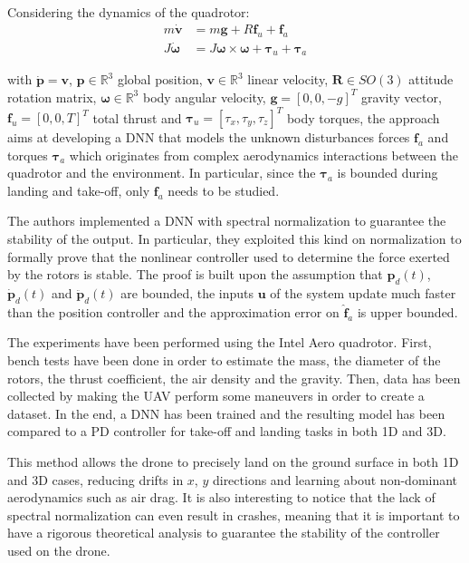 \documentclass[a4paper]{article}
\begin{document}
Considering the dynamics of the quadrotor:
\begin{align}
    m\bm{\dot{v}} &= m\bm{g} + R\bm{f}_u + \bm{f}_a \\
    J\bm{\dot{\omega}} &= J\bm{\omega} \times \bm{\omega} + \bm{\tau}_u + \bm{\tau}_a
\end{align}

\noindent with $\bm{\dot{p}} = \bm{v}$, $\bm{p} \in \mathbb{R}^3$ global
position, $\bm{v} \in \mathbb{R}^3$ linear velocity, $\bm{R} \in SO(3)$
attitude rotation matrix, $\bm{\omega} \in \mathbb{R}^3$ body angular velocity,
$\bm{g} = [0, 0, -g]^T$ gravity vector, $\bm{f}_u = [0, 0, T]^T$ total thrust
and $\bm{\tau}_u = [\tau_x, \tau_y, \tau_z]^T$ body torques, the approach aims
at developing a DNN that models the unknown disturbances forces $\bm{f}_a$
and torques $\bm{\tau}_a$ which originates from complex aerodynamics
interactions between the quadrotor and the environment. In particular,
since the $\bm{\tau}_a$ is bounded during landing and take-off, only
$\bm{f}_a$ needs to be studied.

The authors implemented a DNN with spectral normalization to guarantee the
stability of the output. In particular, they exploited this kind on
normalization to formally prove that the nonlinear controller used to
determine the force exerted by the rotors
is stable. The proof is
built upon the assumption that $\bm{p}_d(t)$, $\bm{\dot{p}}_d(t)$ and
$\bm{\ddot{p}}_d(t)$ are bounded, the inputs $\bm{u}$ of the system update
much faster than the position controller and the approximation error on
$\bm{\hat{f}}_a$ is upper bounded.

The experiments have been performed using the Intel Aero quadrotor. First,
bench tests have been done in order to estimate the mass, the diameter of
the rotors, the thrust coefficient, the air density and the
gravity. Then, data has been collected by making the UAV perform some
maneuvers in order to create a dataset. In the end, a DNN has been trained and
the resulting model has been compared to a PD controller for take-off and
landing tasks in both 1D and 3D.

This method allows the drone to precisely land on the ground surface in both
1D and 3D cases, reducing drifts in $x$, $y$ directions and learning about
non-dominant aerodynamics such as air drag. It is also interesting to notice
that the lack of spectral normalization can even result in crashes, meaning
that it is important to have a rigorous theoretical analysis to guarantee
the stability of the controller used on the drone.
\end{document}
